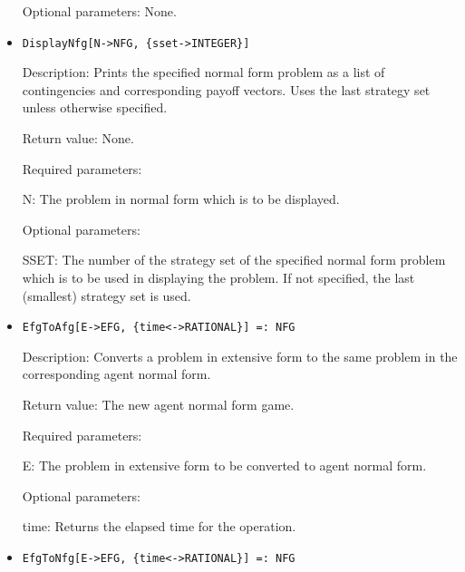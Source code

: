 \begin{itemize}
\item
[Optional parameters:] None.
\ed

\item
\protect \large \begin{verbatim}
DisplayNfg[N->NFG, {sset->INTEGER}]
\end{verbatim}\normalsize

\bd
\item
[Description:] Prints the specified normal form problem as a list of
contingencies and corresponding payoff vectors.  Uses the last
strategy set unless otherwise specified.
\item
[Return value:] None.
\item
[Required parameters:]\hfil\null

\bd	
\item
[ N:] The problem in normal form which is to be displayed.
\ed

\item
[Optional parameters:]\hfil\null	

\bd
\item
[ SSET:] The number of the strategy set of the specified normal form
problem which is to be used in displaying the problem.  If not
specified, the last (smallest) strategy set is used.
\ed
\ed

\item
\protect \large \begin{verbatim}
EfgToAfg[E->EFG, {time<->RATIONAL}] =: NFG
\end{verbatim}\normalsize

\bd
\item
[Description:] Converts a problem in extensive form to the same problem
in the corresponding agent normal form.
\item
[Return value:] The new agent normal form game.  
\item 
[Required parameters:]\hfil\null

\bd
\item
[ E:] The problem in extensive form to be converted to agent normal form.
\ed

\item
[Optional parameters:]\hfil\null
	
\bd
\item
[ time:] Returns the elapsed time for the operation.
\ed
\ed

\item
\protect \large \begin{verbatim}
EfgToNfg[E->EFG, {time<->RATIONAL}] =: NFG
\end{verbatim}\normalsize


\end{itemize}

